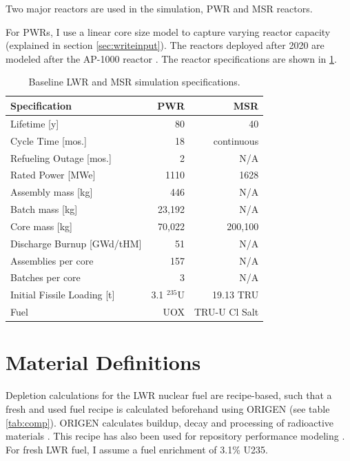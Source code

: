 Two major reactors are used in the simulation, \gls{PWR} and \gls{MSR}
reactors. 

For \glspl{PWR}, I use a linear core size model to capture varying reactor capacity
(explained in section \ref{sec:writeinput}). The reactors deployed after 2020 are
modeled after the AP-1000 reactor \cite{sutharshan_ap1000tm_2011}. The reactor
specifications are shown in \ref{tab:us-reactor-specs}.

\begin{table}[h]
	\centering
	\caption{Baseline \gls{LWR} and \gls{MSR} simulation specifications.}
	\begin{tabular}{lrr}
		\hline
		\textbf{Specification} & \textbf{\gls{PWR} \cite{sutharshan_ap1000tm_2011}} & \textbf{\gls{MSR} \cite{mourogov_potentialities_2006}} \\
		\hline
		Lifetime [y]  & 80 & 40 \\
		Cycle Time [mos.]& 18 & continuous \\ 
		Refueling Outage [mos.]& 2 & N/A \\
		Rated Power [\gls{MWe}] & 1110 & 1628 \\
		Assembly mass [kg] & 446 & N/A \\
		Batch mass [kg] & 23,192 & N/A \\
		Core mass [kg] & 70,022 & 200,100 \\
		Discharge Burnup [GWd/tHM] & 51 & N/A \\
		Assemblies per core & 157  & N/A \\
		Batches per core & 3 & N/A \\
		Initial Fissile Loading [t] & 3.1  $^{235}$U & 19.13 \gls{TRU} \\
		Fuel & \gls{UOX} & \gls{TRU}-U Cl Salt \\
		\hline
	\end{tabular}
	\label{tab:us-reactor-specs}
\end{table}


\section{Material Definitions}
Depletion calculations for the \gls{LWR} nuclear fuel are recipe-based, such 
that a fresh and used fuel recipe is calculated beforehand using ORIGEN (see table \ref{tab:comp}).
ORIGEN calculates buildup, decay and processing of radioactive materials
\cite{parks_overview_1992}. This recipe has also been used for
repository performance modeling \cite{wilson_adoption_2009}.
For fresh \gls{LWR} fuel, I assume a fuel enrichment of 3.1\% U235.

